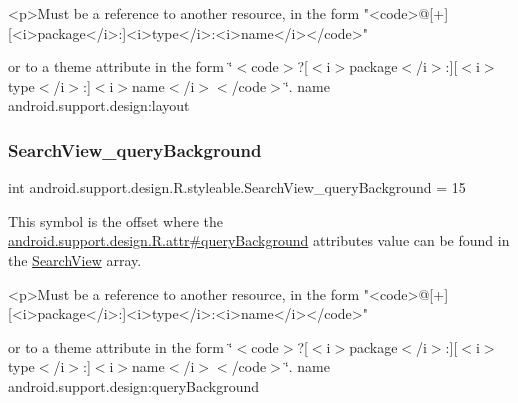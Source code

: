 \begin{DoxyVerb}      <p>Must be a reference to another resource, in the form "<code>@[+][<i>package</i>:]<i>type</i>:<i>name</i></code>"
\end{DoxyVerb}
 or to a theme attribute in the form \char`\"{}$<$code$>$?\mbox{[}$<$i$>$package$<$/i$>$\+:\mbox{]}\mbox{[}$<$i$>$type$<$/i$>$\+:\mbox{]}$<$i$>$name$<$/i$>$$<$/code$>$\char`\"{}.  name android.\+support.\+design\+:layout \mbox{\label{classandroid_1_1support_1_1design_1_1R_1_1styleable_a625f77d9f60563036744e0de3279d85b}} 
\subsubsection{\texorpdfstring{Search\+View\+\_\+query\+Background}{SearchView\_queryBackground}}
{\footnotesize\ttfamily int android.\+support.\+design.\+R.\+styleable.\+Search\+View\+\_\+query\+Background = 15\hspace{0.3cm}{\ttfamily [static]}}

This symbol is the offset where the \hyperlink{classandroid_1_1support_1_1design_1_1R_1_1attr_aac7f3cc9efb220e9fa9bfe562916b922}{android.\+support.\+design.\+R.\+attr\#query\+Background} attribute\textquotesingle{}s value can be found in the \hyperlink{classandroid_1_1support_1_1design_1_1R_1_1styleable_a8f7e72dc1bf854e14c1be7dbc1cb7392}{Search\+View} array.

\begin{DoxyVerb}      <p>Must be a reference to another resource, in the form "<code>@[+][<i>package</i>:]<i>type</i>:<i>name</i></code>"
\end{DoxyVerb}
 or to a theme attribute in the form \char`\"{}$<$code$>$?\mbox{[}$<$i$>$package$<$/i$>$\+:\mbox{]}\mbox{[}$<$i$>$type$<$/i$>$\+:\mbox{]}$<$i$>$name$<$/i$>$$<$/code$>$\char`\"{}.  name android.\+support.\+design\+:query\+Background \mbox{\label{classandroid_1_1support_1_1design_1_1R_1_1styleable_a879468cbbd5600253d62fe8000d05975}} 
